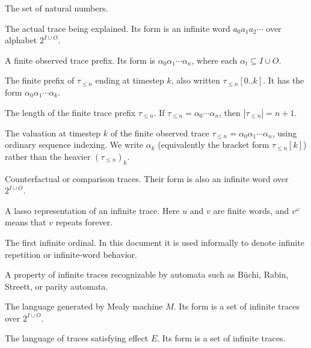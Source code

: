 \documentclass[11pt]{article}
\theoremstyle{remark}
\newcommand{\Lang}{\mathcal{L}}
\newcommand{\Nat}{\mathbb{N}}
\begin{document}
\begin{description}[leftmargin=2.8cm,style=nextline]
  \item[\(\Nat\)]
  The set of natural numbers.

  \item[\(\tau\)]
  The actual trace being explained. Its form is an infinite word
  \(a_0a_1a_2\cdots\) over alphabet \(2^{I\cup O}\).

  \item[\(\tau_{\le n}\)]
  A finite observed trace prefix. Its form is
  \(\alpha_0\alpha_1\cdots\alpha_n\), where each
  \(\alpha_t\subseteq I\cup O\).

  \item[\(\tau_{\le k}\)]
  The finite prefix of \(\tau_{\le n}\) ending at timestep \(k\), also written
  \(\tau_{\le n}[0..k]\). It has the form \(\alpha_0\alpha_1\cdots\alpha_k\).

  \item[\(|\tau_{\le n}|\)]
  The length of the finite trace prefix \(\tau_{\le n}\). If
  \(\tau_{\le n}=\alpha_0\cdots\alpha_n\), then
  \(|\tau_{\le n}|=n+1\).

  \item[\(\alpha_k\)]
  The valuation at timestep \(k\) of the finite observed trace
  \(\tau_{\le n}=\alpha_0\alpha_1\cdots\alpha_n\), using ordinary sequence
  indexing. We write \(\alpha_k\) (equivalently the bracket form
  \(\tau_{\le n}[k]\)) rather than the heavier \((\tau_{\le n})_k\).

  \item[\(\tau'\), \(\tau''\)]
  Counterfactual or comparison traces. Their form is also an infinite word over
  \(2^{I\cup O}\).

  \item[\(uv^\omega\)]
  A lasso representation of an infinite trace. Here \(u\) and \(v\) are finite
  words, and \(v^\omega\) means that \(v\) repeats forever.

  \item[\(\omega\)]
  The first infinite ordinal. In this document it is used informally to denote
  infinite repetition or infinite-word behavior.

  \item[\(\omega\)-regular property]
  A property of infinite traces recognizable by automata such as B\"uchi,
  Rabin, Streett, or parity automata.

  \item[\(\Lang(M)\)]
  The language generated by Mealy machine \(M\). Its form is a set of infinite
  traces over \(2^{I\cup O}\).

  \item[\(\Lang(E)\)]
  The language of traces satisfying effect \(E\). Its form is a set of infinite
  traces.


\end{description}
\end{document}
